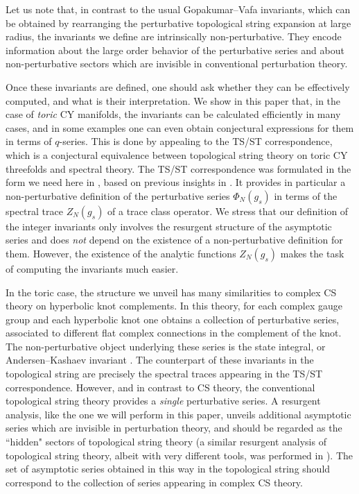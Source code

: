 \documentclass[a4paper,11pt]{article}
\theoremstyle{definition}
\begin{document}
Let us note that, in contrast to the usual Gopakumar--Vafa invariants, 
which can be obtained by rearranging the perturbative topological string expansion at large radius, the invariants we 
define are intrinsically non-perturbative. They encode information about the large order behavior of the perturbative series and 
about non-perturbative sectors which are invisible in conventional perturbation theory. 

Once these invariants are defined, one should ask whether they can be effectively computed, 
and what is their interpretation. We show in this paper that, in the case 
of {\it toric} CY manifolds, the invariants can be calculated efficiently in many cases, and in some examples 
one can even obtain conjectural 
expressions for them in terms of $q$-series. This is done by appealing to the TS/ST correspondence, which is a 
conjectural equivalence between topological string theory on toric CY threefolds and spectral theory.  
The TS/ST correspondence was formulated in the form we need here in \cite{ghm,cgm}, 
based on previous insights in \cite{mp,hmo2,hmo3,hmmo,km,hw}. It provides in particular 
a non-perturbative definition of the perturbative series $\Phi_N(g_s)$ in terms of the spectral trace $Z_N(g_s)$ of a trace class operator. 
We stress that our definition of the integer invariants only involves the resurgent structure of the asymptotic series and 
does {\it not} depend on the existence of a non-perturbative 
definition for them. However, the existence of the analytic functions $Z_N(g_s)$ makes the task of computing the invariants much easier.  

In the toric case, the structure we unveil has many similarities to complex CS theory on hyperbolic knot complements. 
In this theory, for each complex gauge group and each hyperbolic knot 
one obtains a collection of perturbative series, associated to different flat complex connections in the complement of the knot. The 
non-perturbative object underlying these series is the state integral, or Andersen--Kashaev invariant \cite{hikami, dglz, ak}. The counterpart of these 
invariants in the topological string are precisely the spectral traces appearing in the TS/ST correspondence. However, and in contrast to CS theory, the conventional topological 
string theory provides a {\it single} perturbative series. A resurgent analysis, like the one we will perform in this paper, 
unveils additional asymptotic series which are invisible in perturbation theory, and should be regarded as the ``hidden" sectors of topological string theory (a similar resurgent analysis of topological string theory, albeit with very different tools, was performed in \cite{cesv1,cesv2}). The set of asymptotic series obtained in this way in the topological string should correspond to the collection of series appearing in complex CS theory.  
\end{document}
